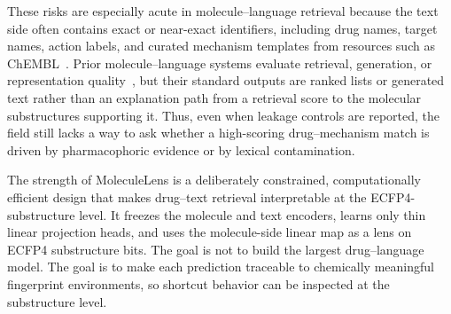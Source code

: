 \documentclass{article}
\begin{document}
These risks are especially acute in molecule--language retrieval because the text side often contains exact or near-exact identifiers, including drug names, target names, action labels, and curated mechanism templates from resources such as ChEMBL~\citep{gaulton2012chembl,zdrazil2024chembl}. Prior molecule--language systems evaluate retrieval, generation, or representation quality~\citep{edwards2021text2mol,edwards2022molt5,pei2023biot5,liu2023molca,zeng2022kvplm}, but their standard outputs are ranked lists or generated text rather than an explanation path from a retrieval score to the molecular substructures supporting it. Thus, even when leakage controls are reported, the field still lacks a way to ask whether a high-scoring drug--mechanism match is driven by pharmacophoric evidence or by lexical contamination.

The strength of MoleculeLens is a deliberately constrained, computationally efficient design that makes drug--text retrieval interpretable at the ECFP4-substructure level. It freezes the molecule and text encoders, learns only thin linear projection heads, and uses the molecule-side linear map as a lens on ECFP4 substructure bits. The goal is not to build the largest drug--language model. The goal is to make each prediction traceable to chemically meaningful fingerprint environments, so shortcut behavior can be inspected at the substructure level.
\end{document}
